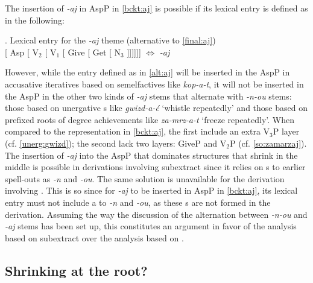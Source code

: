 \vskip 0.25cm
\noindent The insertion of \textit{-aj} in AspP in \ref{bckt:aj} is possible if its lexical entry is defined as in the following:

\ex.\label{alt:aj} Lexical entry for the \textit{-aj} theme (alternative to \ref{final:aj})\\[0.5ex]
[ Asp [ V$_{2}$ [ V$_{1}$ [ Give [ Get [ N$_{3}$ ]]]]]] $\Leftrightarrow$ \textit{-aj}

\noindent
However, while the entry defined as in \ref{alt:aj} will be inserted in the AspP in accusative iteratives based on  semelfactives like \textit{kop-a-t}, it
will not be inserted in the AspP in the other two kinds of \textit{-aj} stems that alternate with \textit{-n-ou} stems: those based on unergative s like \textit{gwizd-a-\'c} `whistle repeatedly' and those based on prefixed roots of  degree achievements like \textit{za-mrz-a-t} `freeze repeatedly'.  
When compared to the representation in \ref{bckt:aj}, the first include an extra V$_{3}$P layer (cf. \ref{unerg:gwizd}); the second lack two layers: GiveP and V$_{2}$P (cf. \ref{so:zamarzaj}). 
The insertion of \textit{-aj} into the AspP that dominates structures that shrink  in the middle is possible in derivations involving subextract since it relies on s to earlier spell-outs as \textit{-n} and \textit{-ou}. The same solution is unavailable for the derivation involving . This is so since for \textit{-aj} to be inserted in AspP in \ref{bckt:aj}, its lexical entry must not include a  to \textit{-n} and \textit{-ou}, as these s are not formed in the  derivation. Assuming the way the discussion of the  alternation between \textit{-n-ou} and \textit{-aj} stems has been set up, this constitutes an argument in favor of the analysis based on subextract over the analysis based on . 

\subsection{Shrinking  at the root?}


